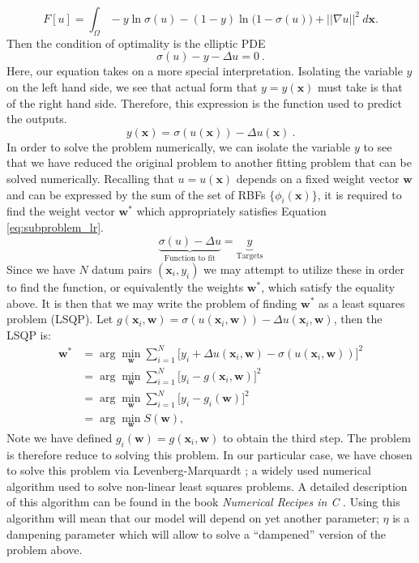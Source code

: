\documentclass{INGUADY}
\begin{document}
\begin{body}
\begin{equation*}
F[u] = \int_\Omega -y \ln \sigma(u)  - (1 - y) \ln \big(  1-  \sigma(u)  \big)   +  ||  \nabla u  ||^2   \ d\mathbf{x}.
\end{equation*}
Then the condition of optimality is the elliptic PDE 
\begin{equation*}
\sigma(u) - y - \Delta u = 0 \ .
\end{equation*}
Here, our equation takes on a more special interpretation. Isolating the variable $y$ on the left hand side, we see that actual form that $y= y(\mathbf{x})$ must take is that of the right hand side. Therefore, this expression is the function used to predict the outputs.
\begin{equation*}
y(\mathbf{x}) = \sigma(u(\mathbf{x})) - \Delta u(\mathbf{x}) \ .
\end{equation*}
In order to solve the problem numerically, we can isolate the variable $y$ to see that we have reduced the original problem to another fitting problem that can be solved numerically. Recalling that $u = u(\mathbf{x})$ depends on a fixed weight vector $\mathbf{w}$ and can be expressed by the sum of the set of RBFs $\{ \phi_i(\mathbf{x}) \}$, it is required to find the weight vector $\mathbf{w}^*$ which appropriately satisfies Equation \ref{eq:subproblem_lr}.
\begin{equation} \label{eq:subproblem_lr}
\underbrace{ \sigma(u) - \Delta u}_{\text{Function to fit}}   = \underbrace{y}_{\text{Targets}}
\end{equation}
Since we have $N$ datum pairs $(\mathbf{x}_i, y_i)$ we may attempt to utilize these in order to find the function, or equivalently the weights $\mathbf{w}^*$, which satisfy the equality above. It is then that we may write the problem of finding $\mathbf{w}^*$ as a least squares problem (LSQP). Let $g(\mathbf{x}_i, \mathbf{w}) = \sigma(u(\mathbf{x}_i, \mathbf{w})) - \Delta u(\mathbf{x}_i, \mathbf{w})$, then the LSQP is:
\begin{align}
\mathbf{w}^* &= \arg \min_{\mathbf{w}} \sum^N_{i=1} \big[   y_i   +  \Delta u(\mathbf{x}_i, \mathbf{w})  -  \sigma(u(\mathbf{x}_i, \mathbf{w}))    \big]^2 \\
&= \arg \min_{\mathbf{w}} \sum^N_{i=1} \big[ y_i - g(\mathbf{x}_i, \mathbf{w})  \big]^2  \\
&=  \arg \min_{\mathbf{w}} \sum^N_{i=1} \big[ y_i - g_i(\mathbf{w})  \big]^2 \\
&= \arg \min_\mathbf{w} S(\mathbf{w}) \label{eq:least_squares},
\end{align}
Note we have defined $g_i(\mathbf{w}) = g(\mathbf{x}_i, \mathbf{w})$ to obtain the third step. The problem is therefore reduce to solving this problem. In our particular case, we have chosen to solve this problem via Levenberg-Marquardt \cite{levenberg}; a widely used numerical algorithm used to solve non-linear least squares problems. A detailed description of this algorithm can be found in  the book \textit{Numerical Recipes in C} \cite{williamnum}. Using this algorithm will mean that our model will depend on yet another parameter; $\eta$ is a dampening parameter which will allow to solve a ``dampened'' version of the problem above.


\end{body}
\end{document}
